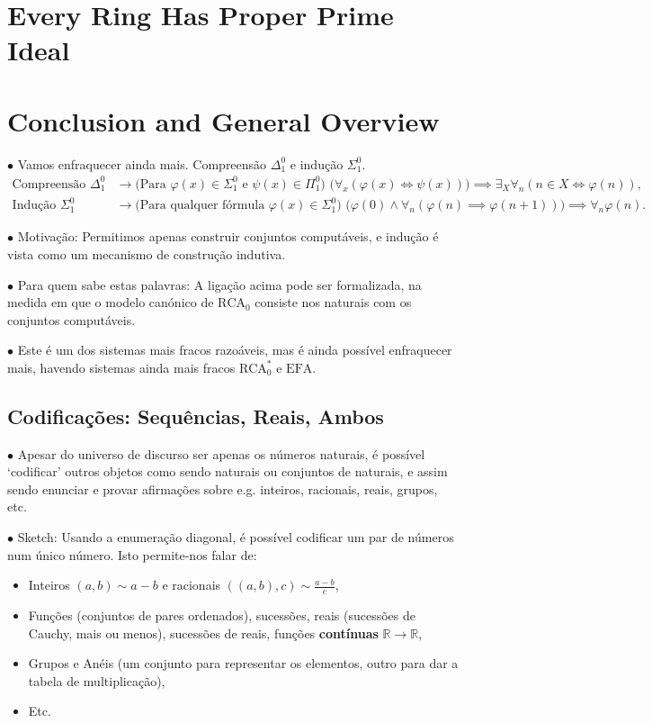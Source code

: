 \documentclass{article}
\theoremstyle{nonumberplain}
\newcommand{\R}{\mathbb{R}}
\newcommand{\EFA}{\mathrm{EFA}}
\newcommand{\RCA}{\mathrm{RCA}}
\newcommand\point[1]{\noindent \hspace{\labelsep} $\bullet$ #1 \smallskip}
\begin{document}
\section{Every Ring Has Proper Prime Ideal}

\section{Conclusion and General Overview}

\point{Vamos enfraquecer ainda mais. Compreensão $\Delta^0_1$ e indução $\Sigma^0_1$.}
\begin{equation}
\begin{aligned}
\text{Compreensão $\Delta^0_1$} &\rightarrow \text{(Para $\varphi(x) \in \Sigma^0_1$ e $\psi(x) \in \Pi^0_1$) } \big(\forall_x (\varphi(x) \Leftrightarrow \psi(x)) \big) \implies \exists_X \forall_n (n \in X \iff \varphi(n)),\\
\text{Indução $\Sigma^0_1$ } &\rightarrow \text{(Para qualquer fórmula $\varphi(x) \in \Sigma^0_1$) } \big(\varphi(0) \land \forall_n (\varphi(n) \implies \varphi(n+1)) \big) \implies \forall_n \varphi(n).
\end{aligned}
\end{equation}

\point{Motivação: Permitimos apenas construir conjuntos computáveis, e indução é vista como um mecanismo de construção indutiva.}

\point{Para quem sabe estas palavras: A ligação acima pode ser formalizada, na medida em que o modelo canónico de $\RCA_0$ consiste nos naturais com os conjuntos computáveis.}

\point{Este é um dos sistemas mais fracos razoáveis, mas é ainda possível enfraquecer mais, havendo sistemas ainda mais fracos $\RCA_0^*$ e $\EFA$.}

\subsection{Codificações: Sequências, Reais, Ambos}

\point{Apesar do universo de discurso ser apenas os números naturais, é possível `codificar' outros objetos como sendo naturais ou conjuntos de naturais, e assim sendo enunciar e provar afirmações sobre e.g. inteiros, racionais, reais, grupos, etc.}

\point{Sketch: Usando a enumeração diagonal, é possível codificar um par de números num único número. Isto permite-nos falar de:

\begin{itemize}
\item Inteiros $(a,b) \sim a-b$ e racionais $((a,b),c) \sim \frac{a-b}c$,
\item Funções (conjuntos de pares ordenados), sucessões, reais (sucessões de Cauchy, mais ou menos), sucessões de reais, funções \textbf{contínuas} $\R \to \R$,
\item Grupos e Anéis (um conjunto para representar os elementos, outro para dar a tabela de multiplicação),
\item Etc.
\end{itemize}
}
\end{document}
